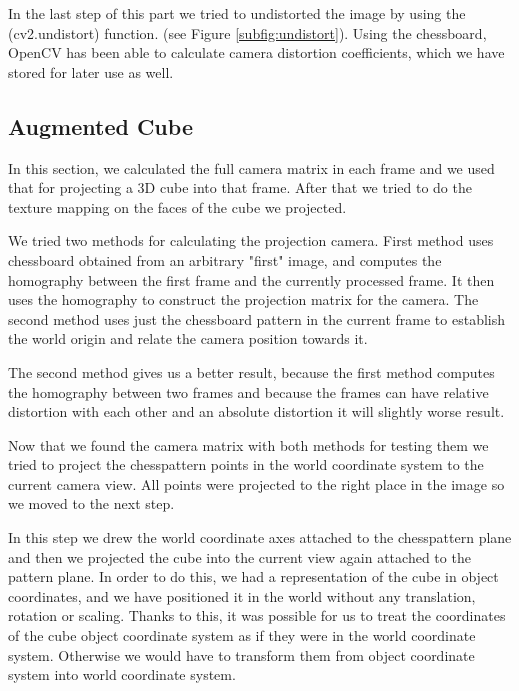 In the last step of this part we tried to undistorted the image by using the (cv2.undistort) function. (see Figure \ref{subfig:undistort}). Using the chessboard, OpenCV has been able to calculate camera distortion coefficients, which we have stored for later use as well.

\subsection{Augmented Cube}
In this section, we calculated the full camera matrix in each frame and we used that for projecting a 3D cube into that frame. After that we tried to do the texture mapping on the faces of the cube we projected.

We tried two methods for calculating the projection camera. First method uses chessboard obtained from an arbitrary "first" image, and computes the homography between the first frame and the currently processed frame. It then uses the homography to construct the projection matrix for the camera. The second method uses just the chessboard pattern in the current frame to establish the world origin and relate the camera position towards it.

The second method gives us a better result, because the first method computes the homography between two frames and because the frames can have relative distortion with each other and an absolute distortion it will slightly worse result.

Now that we found the camera matrix with both methods for testing them we tried to project the chesspattern points in the world coordinate system to the current camera view. All points were projected to the right place in the image so we moved to the next step.

In this step we drew the world coordinate axes attached to the chesspattern plane and then we projected the cube into the current view again attached to the pattern plane. In order to do this, we had a representation of the cube in object coordinates, and we have positioned it in the world without any translation, rotation or scaling. Thanks to this, it was possible for us to treat the coordinates of the cube object coordinate system as if they were in the world coordinate system. Otherwise we would have to transform them from object coordinate system into world coordinate system.

